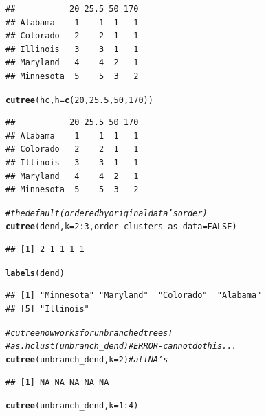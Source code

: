 \documentclass[shortnames,nojss,article]{jss}\usepackage[]{graphicx}\usepackage[]{color}
\makeatletter
\newcommand{\hlnum}[1]{\textcolor[rgb]{0.686,0.059,0.569}{#1}}%
\newcommand{\hlcom}[1]{\textcolor[rgb]{0.678,0.584,0.686}{\textit{#1}}}%
\newcommand{\hlopt}[1]{\textcolor[rgb]{0,0,0}{#1}}%
\newcommand{\hlstd}[1]{\textcolor[rgb]{0.345,0.345,0.345}{#1}}%
\newcommand{\hlkwc}[1]{\textcolor[rgb]{0.333,0.667,0.333}{#1}}%
\newcommand{\hlkwd}[1]{\textcolor[rgb]{0.737,0.353,0.396}{\textbf{#1}}}%
\newenvironment{kframe}{%
 \def\at@end@of@kframe{}%
 \ifinner\ifhmode%
  \def\at@end@of@kframe{\end{minipage}}%
  \begin{minipage}{\columnwidth}%
 \fi\fi%
 \def\FrameCommand##1{\hskip\@totalleftmargin \hskip-\fboxsep
 \colorbox{shadecolor}{##1}\hskip-\fboxsep
     \hskip-\linewidth \hskip-\@totalleftmargin \hskip\columnwidth}%
 \MakeFramed {\advance\hsize-\width
   \@totalleftmargin\z@ \linewidth\hsize
   \@setminipage}}%
 {\par\unskip\endMakeFramed%
 \at@end@of@kframe}
\newenvironment{knitrout}{}{} %
\makeatother
\begin{document}
\begin{knitrout}
\begin{kframe}
\begin{verbatim}
##           20 25.5 50 170
## Alabama    1    1  1   1
## Colorado   2    2  1   1
## Illinois   3    3  1   1
## Maryland   4    4  2   1
## Minnesota  5    5  3   2
\end{verbatim}
\begin{alltt}
\hlkwd{cutree}\hlstd{(hc,} \hlkwc{h} \hlstd{=} \hlkwd{c}\hlstd{(}\hlnum{20}\hlstd{,} \hlnum{25.5}\hlstd{,} \hlnum{50}\hlstd{,} \hlnum{170}\hlstd{))}
\end{alltt}
\begin{verbatim}
##           20 25.5 50 170
## Alabama    1    1  1   1
## Colorado   2    2  1   1
## Illinois   3    3  1   1
## Maryland   4    4  2   1
## Minnesota  5    5  3   2
\end{verbatim}
\begin{alltt}
\hlcom{# the default (ordered by original data's order)}
\hlkwd{cutree}\hlstd{(dend,} \hlkwc{k} \hlstd{=} \hlnum{2}\hlopt{:}\hlnum{3}\hlstd{,} \hlkwc{order_clusters_as_data} \hlstd{=} \hlnum{FALSE}\hlstd{)}
\end{alltt}
\begin{verbatim}
## [1] 2 1 1 1 1
\end{verbatim}
\begin{alltt}
\hlkwd{labels}\hlstd{(dend)}
\end{alltt}
\begin{verbatim}
## [1] "Minnesota" "Maryland"  "Colorado"  "Alabama"  
## [5] "Illinois"
\end{verbatim}
\begin{alltt}
\hlcom{# cutree now works for unbranched trees!}
\hlcom{# as.hclust(unbranch_dend) # ERROR - can not do this...}
\hlkwd{cutree}\hlstd{(unbranch_dend,} \hlkwc{k} \hlstd{=} \hlnum{2}\hlstd{)}  \hlcom{# all NA's}
\end{alltt}


{\ttfamily\noindent\color{warningcolor}{\#\# Warning: Couldn't cut the tree - returning NA.\\\#\# Warning: You (probably) have some branches with equal heights so that there exist no height(h) that can create 2\ \ clusters}}\begin{verbatim}
## [1] NA NA NA NA NA
\end{verbatim}
\begin{alltt}
\hlkwd{cutree}\hlstd{(unbranch_dend,} \hlkwc{k} \hlstd{=} \hlnum{1}\hlopt{:}\hlnum{4}\hlstd{)}
\end{alltt}



\end{kframe}
\end{knitrout}
\end{document}
